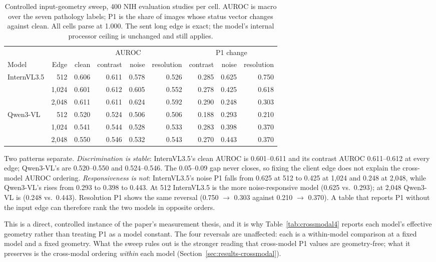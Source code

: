 \begin{table}[t]
\centering
\footnotesize
\setlength{\tabcolsep}{3.5pt}
\caption{Controlled input-geometry sweep, 400 NIH evaluation studies per cell. AUROC is
macro over the seven pathology labels; P1 is the share of images whose status vector
changes against clean. All cells parse at 1.000. The sent long edge is exact; the model's
internal processor ceiling is unchanged and still applies.}
\label{tab:geometry-sweep}
\begin{tabular}{lrrrrrrrr}
\toprule
& & \multicolumn{4}{c}{AUROC} & \multicolumn{3}{c}{P1 change} \\
\cmidrule(lr){3-6}\cmidrule(lr){7-9}
Model & Edge & clean & contrast & noise & resolution & contrast & noise & resolution \\
\midrule
InternVL3.5 & 512 & 0.606 & 0.611 & 0.578 & 0.526 & 0.285 & 0.625 & 0.750 \\
            & 1,024 & 0.601 & 0.612 & 0.605 & 0.552 & 0.278 & 0.425 & 0.618 \\
            & 2,048 & 0.611 & 0.611 & 0.624 & 0.592 & 0.290 & 0.248 & 0.303 \\
\midrule
Qwen3-VL    & 512 & 0.520 & 0.524 & 0.506 & 0.506 & 0.188 & 0.293 & 0.210 \\
            & 1,024 & 0.541 & 0.544 & 0.528 & 0.533 & 0.283 & 0.398 & 0.370 \\
            & 2,048 & 0.550 & 0.546 & 0.532 & 0.543 & 0.270 & 0.443 & 0.370 \\
\bottomrule
\end{tabular}
\end{table}

Two patterns separate. \emph{Discrimination is stable}: InternVL3.5's clean AUROC is
0.601--0.611 and its contrast AUROC 0.611--0.612 at every edge; Qwen3-VL's are 0.520--0.550
and 0.524--0.546. The 0.05--0.09 gap never closes, so fixing the client edge does not explain
the cross-model AUROC ordering. \emph{Responsiveness is not}: InternVL3.5's noise P1 falls
from 0.625 at 512 to 0.425 at 1,024 and 0.248 at 2,048, while Qwen3-VL's rises from 0.293 to
0.398 to 0.443. At 512 InternVL3.5 is the more noise-responsive model (0.625 vs.\ 0.293); at
2,048 Qwen3-VL is (0.248 vs.\ 0.443). Resolution P1 shows the same reversal (0.750 $\rightarrow$
0.303 against 0.210 $\rightarrow$ 0.370). A table that reports P1 without the input edge can
therefore rank the two models in opposite orders.

This is a direct, controlled instance of the paper's measurement thesis, and it is why
Table~\ref{tab:crossmodal4} reports each model's effective geometry rather than treating P1
as a model constant. The four reversals are unaffected: each is a within-model comparison at
a fixed model and a fixed geometry. What the sweep rules out is the stronger reading that
cross-model P1 values are geometry-free; what it preserves is the cross-modal ordering
\emph{within} each model (Section~\ref{sec:results-crossmodal}).
